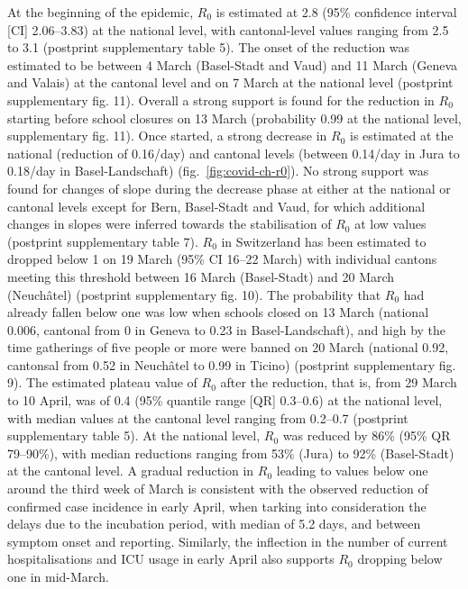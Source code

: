 At the beginning of the epidemic, $R_0$ is estimated at 2.8 (95\% confidence interval [CI] 2.06–3.83) at the national level, with cantonal-level values ranging from 2.5 to 3.1 (postprint supplementary table 5). The onset of the reduction was estimated to be between 4 March (Basel-Stadt and Vaud) and 11 March (Geneva and Valais) at the cantonal level and on 7 March at the national level (postprint supplementary fig. 11). Overall a strong support is found for the reduction in $R_0$ starting before school closures on 13 March (probability 0.99 at the national level, supplementary fig. 11). Once started, a strong decrease in $R_0$ is estimated at the national (reduction of 0.16/day) and cantonal levels (between 0.14/day in Jura to 0.18/day in Basel-Landschaft) (fig.~\ref{fig:covid-ch-r0}). No strong support was found for changes of slope during the decrease phase at either at the national or cantonal levels except for Bern, Basel-Stadt and Vaud, for which additional changes in slopes were inferred towards the stabilisation of $R_0$ at low values (postprint supplementary table 7). $R_0$ in Switzerland has been estimated to dropped below 1 on 19 March (95\% CI 16–22 March) with individual cantons meeting this threshold between 16 March (Basel-Stadt) and 20 March (Neuchâtel) (postprint supplementary fig. 10). The probability that $R_0$ had already fallen below one was low when schools closed on 13 March (national 0.006, cantonal from 0 in Geneva to 0.23 in Basel-Landschaft), and high by the time gatherings of five people or more were banned on 20 March (national 0.92, cantonsal from 0.52 in Neuchâtel to 0.99 in Ticino) (postprint supplementary fig. 9). The estimated plateau value of $R_0$ after the reduction, that is, from 29 March to 10 April, was of 0.4 (95\% quantile range [QR] 0.3–0.6) at the national level, with median values at the cantonal level ranging from 0.2–0.7 (postprint supplementary table 5). At the national level, $R_0$ was reduced by 86\% (95\% QR 79–90\%), with median reductions ranging from 53\% (Jura) to 92\% (Basel-Stadt) at the cantonal level. A gradual reduction in $R_0$ leading to values below one around the third week of March is consistent with the observed reduction of confirmed case incidence in early April, when tarking into consideration the delays due to the incubation period, with median of 5.2 days\cite[-5\baselineskip]{Lauer:IncubationPeriodCoronavirus:2020}, and between symptom onset and reporting\cite[-2\baselineskip]{Bi:EpidemiologyTransmissionCOVID19:2020}. Similarly, the inflection in the number of current hospitalisations and ICU usage in early April also supports $R_0$ dropping below one in mid-March. 
